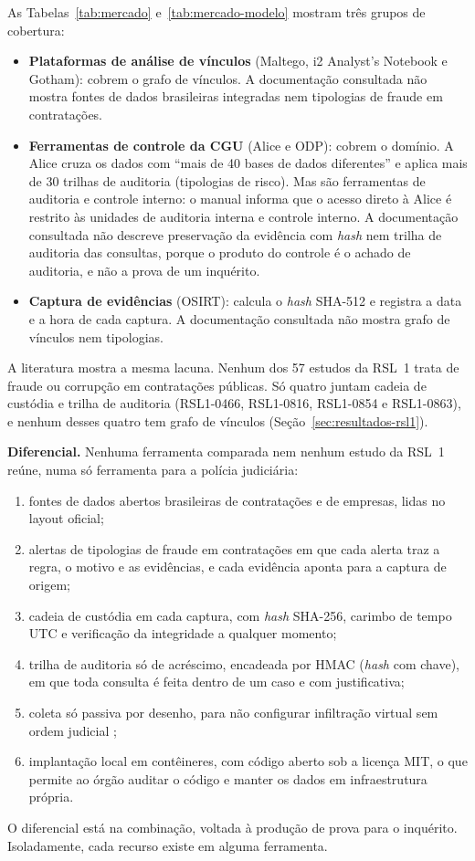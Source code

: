 As Tabelas~\ref{tab:mercado} e~\ref{tab:mercado-modelo} mostram três grupos de cobertura:
\begin{itemize}
	\item \textbf{Plataformas de análise de vínculos} (Maltego, i2 Analyst's
	Notebook e Gotham): cobrem o grafo de vínculos. A documentação consultada
	não mostra fontes de dados brasileiras integradas nem tipologias de fraude
	em contratações.
	\item \textbf{Ferramentas de controle da CGU} (Alice e ODP): cobrem o
	domínio. A Alice cruza os dados com ``mais de 40 bases de dados
	diferentes'' e aplica mais de 30 trilhas de auditoria (tipologias de
	risco). Mas são ferramentas de auditoria e controle interno: o manual
	informa que o acesso direto à Alice é restrito às unidades de auditoria
	interna e controle interno. A documentação consultada não descreve
	preservação da evidência com \textit{hash} nem trilha de auditoria das
	consultas, porque o produto do controle é o achado de auditoria, e não a
	prova de um inquérito.
	\item \textbf{Captura de evidências} (OSIRT): calcula o \textit{hash}
	SHA-512 e registra a data e a hora de cada captura. A documentação
	consultada não mostra grafo de vínculos nem tipologias.
\end{itemize}

A literatura mostra a mesma lacuna. Nenhum dos 57 estudos da RSL~1 trata de
fraude ou corrupção em contratações públicas. Só quatro juntam cadeia de
custódia e trilha de auditoria (RSL1-0466, RSL1-0816, RSL1-0854 e
RSL1-0863), e nenhum desses quatro tem grafo de vínculos
(Seção~\ref{sec:resultados-rsl1}).

\textbf{Diferencial.} Nenhuma ferramenta comparada nem nenhum estudo da
RSL~1 reúne, numa só ferramenta para a polícia judiciária:
\begin{enumerate}
	\item fontes de dados abertos brasileiras de contratações e de empresas,
	lidas no layout oficial;
	\item alertas de tipologias de fraude em contratações em que cada alerta
	traz a regra, o motivo e as evidências, e cada evidência aponta para a
	captura de origem;
	\item cadeia de custódia em cada captura, com \textit{hash} SHA-256,
	carimbo de tempo UTC e verificação da integridade a qualquer momento;
	\item trilha de auditoria só de acréscimo, encadeada por HMAC (\textit{hash} com chave), em
	que toda consulta é feita dentro de um caso e com justificativa;
	\item coleta só passiva por desenho, para não configurar infiltração
	virtual sem ordem judicial \cite[art. 10-A]{brasil2013lei12850};
	\item implantação local em contêineres, com código aberto sob a licença
	MIT, o que permite ao órgão auditar o código e manter os dados em
	infraestrutura própria.
\end{enumerate}
O diferencial está na combinação, voltada à produção de prova para o
inquérito. Isoladamente, cada recurso existe em alguma ferramenta.

